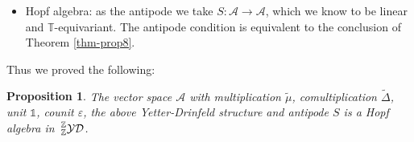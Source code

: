 \documentclass[12pt,reqno,a4paper]{amsart}
\newtheorem{proposition}{Proposition}[section]
\theoremstyle{definition}
\newcommand{\eps}{\varepsilon}
\newcommand{\I}{\mathds{1}}
\newcommand{\id}{\mathrm{id}}
\newcommand{\tens}{\otimes}
\newcommand{\TT}{\mathbb{T}}
\newcommand{\ZZ}{\mathbb{Z}}
\newcommand{\cA}{\mathscr{A}}
\numberwithin{equation}{section}
\begin{document}
\begin{itemize}
\begin{align*}
(\id\tens c_{\cA,\cA}\tens\id)\bigl(
(\widetilde{\Delta}\tens\widetilde{\Delta})(a\tens b)
\bigr)
\Bigr)\\
&=\sum (\widetilde{\mu}\tens\widetilde{\mu})\bigl(
(\id\tens c_{\cA,\cA}\tens\id)
(a_{(1)}\tens a_{(2)}\tens b_{(1)}\tens b_{(2)})
\bigr)\\
&=\sum \zeta^{-\deg(a_{(2)})\deg(b_{(1)})}
(\widetilde{\mu}\tens\widetilde{\mu})(a_{(1)}\tens b_{(1)}\tens a_{(2)}\tens b_{(2)})\\
&=\sum \zeta^{-\deg(a_{(2)})\deg(b_{(1)})}
a_{(1)}b_{(1)}\tens a_{(2)}b_{(2)}.
\end{align*}
\item Hopf algebra: as the antipode we take $S\colon\cA\to\cA$, which we know to be linear and $\TT$-equivariant. The antipode condition is equivalent to the conclusion of Theorem \ref{thm-prop8}.
\end{itemize}

Thus we proved the following:

\begin{proposition}
The vector space $\cA$ with multiplication $\widetilde{\mu}$, comultiplication $\widetilde{\Delta}$, unit $\I$, counit $\eps$, the above Yetter-Drinfeld structure and antipode $S$ is a Hopf algebra in $\sideset{_\ZZ^\ZZ}{}{\operatorname{\mathcal{YD}}}$.
\end{proposition}
\end{document}
